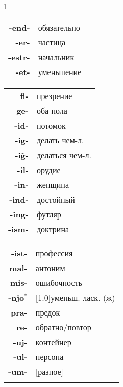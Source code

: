 \documentclass{article}
\begin{document}
\begin{center}
\begin{tabular}{l}
\begin{tabular}{>{\bfseries}rl}
-end- & обязательно \\
-er- & частица \\
-estr- & начальник \\
-et- & уменьшение \\
\end{tabular}
\hspace{-1em}
\begin{tabular}{>{\bfseries}rl}
fi- & презрение \\
ge- & оба пола \\
-id- & потомок \\
-ig- & делать чем-л. \\
-iĝ- & делаться чем-л. \\
-il- & орудие \\
-in- & женщина \\
-ind- & достойный \\
-ing- & футляр \\
-ism- & доктрина \\
\end{tabular}
\hspace{-1em}
\begin{tabular}{>{\bfseries}rl}
-ist- & профессия \\
mal- & антоним \\
mis- & ошибочность \\
-njo$^*$ & \scalebox{.75}[1.0]{уменьш.-ласк. (ж)} \\
pra- & предок \\
re- & обратно/повтор \\
-uj- & контейнер \\
-ul- & персона \\
-um- & [разное] \\
\multicolumn{2}{r}{$^*$\em{к сокращ. корню}} \\
\end{tabular}
\vspace{0.5em}\\


\end{tabular}
\end{center}
\end{document}
